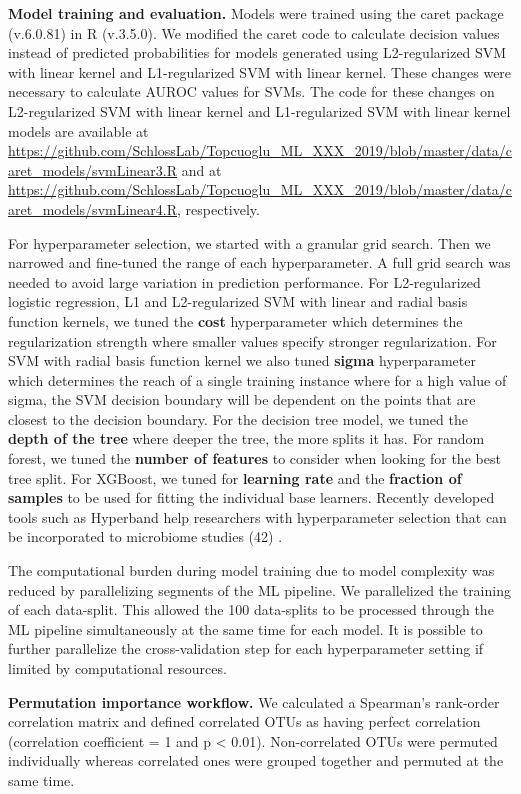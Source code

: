\documentclass[11pt,]{article}
\begin{document}
\textbf{Model training and evaluation.} Models were trained using the
caret package (v.6.0.81) in R (v.3.5.0). We modified the caret code to
calculate decision values instead of predicted probabilities for models
generated using L2-regularized SVM with linear kernel and L1-regularized
SVM with linear kernel. These changes were necessary to calculate AUROC
values for SVMs. The code for these changes on L2-regularized SVM with
linear kernel and L1-regularized SVM with linear kernel models are
available at
\url{https://github.com/SchlossLab/Topcuoglu_ML_XXX_2019/blob/master/data/caret_models/svmLinear3.R}
and at
\url{https://github.com/SchlossLab/Topcuoglu_ML_XXX_2019/blob/master/data/caret_models/svmLinear4.R},
respectively.

For hyperparameter selection, we started with a granular grid search.
Then we narrowed and fine-tuned the range of each hyperparameter. A full
grid search was needed to avoid large variation in prediction
performance. For L2-regularized logistic regression, L1 and
L2-regularized SVM with linear and radial basis function kernels, we
tuned the \textbf{cost} hyperparameter which determines the
regularization strength where smaller values specify stronger
regularization. For SVM with radial basis function kernel we also tuned
\textbf{sigma} hyperparameter which determines the reach of a single
training instance where for a high value of sigma, the SVM decision
boundary will be dependent on the points that are closest to the
decision boundary. For the decision tree model, we tuned the
\textbf{depth of the tree} where deeper the tree, the more splits it
has. For random forest, we tuned the \textbf{number of features} to
consider when looking for the best tree split. For XGBoost, we tuned for
\textbf{learning rate} and the \textbf{fraction of samples} to be used
for fitting the individual base learners. Recently developed tools such
as Hyperband help researchers with hyperparameter selection that can be
incorporated to microbiome studies (42) .

The computational burden during model training due to model complexity
was reduced by parallelizing segments of the ML pipeline. We
parallelized the training of each data-split. This allowed the 100
data-splits to be processed through the ML pipeline simultaneously at
the same time for each model. It is possible to further parallelize the
cross-validation step for each hyperparameter setting if limited by
computational resources.

\textbf{Permutation importance workflow.} We calculated a Spearman's
rank-order correlation matrix and defined correlated OTUs as having
perfect correlation (correlation coefficient = 1 and p \textless{}
0.01). Non-correlated OTUs were permuted individually whereas correlated
ones were grouped together and permuted at the same time.
\end{document}
